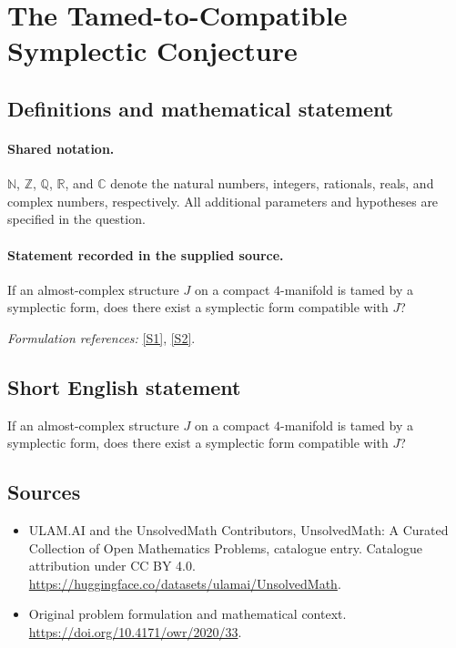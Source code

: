 \documentclass[11pt]{article}
\newcommand{\sref}[2]{\hyperlink{source:#1:#2}{[S#2]}}
\begin{document}
\section{The Tamed-to-Compatible Symplectic Conjecture}\label{statement}

\subsection{Definitions and mathematical statement}

\paragraph{Shared notation.}$\mathbb N$, $\mathbb Z$, $\mathbb Q$, $\mathbb R$, and $\mathbb C$ denote the natural numbers, integers, rationals, reals, and complex numbers, respectively. All additional parameters and hypotheses are specified in the question.


\paragraph{Statement recorded in the supplied source.}
If an almost-complex structure $J$ on a compact $4$-manifold is tamed by a symplectic form, does there exist a symplectic form compatible with $J$?
\par\smallskip\textit{Formulation references:} \sref{statement}{1}, \sref{statement}{2}.
\subsection{Short English statement}
If an almost-complex structure $J$ on a compact $4$-manifold is tamed by a symplectic form, does there exist a symplectic form compatible with $J$?
\subsection{Sources}
\begin{itemize}
\item[\hypertarget{source:statement:1}{S1}] ULAM.AI and the UnsolvedMath Contributors, UnsolvedMath: A Curated Collection of Open Mathematics Problems, catalogue entry. Catalogue attribution under CC BY 4.0.
\url{https://huggingface.co/datasets/ulamai/UnsolvedMath}.
\item[\hypertarget{source:statement:2}{S2}] Original problem formulation and mathematical context.
\url{https://doi.org/10.4171/owr/2020/33}.
\end{itemize}
\label{end:statement}
\end{document}
